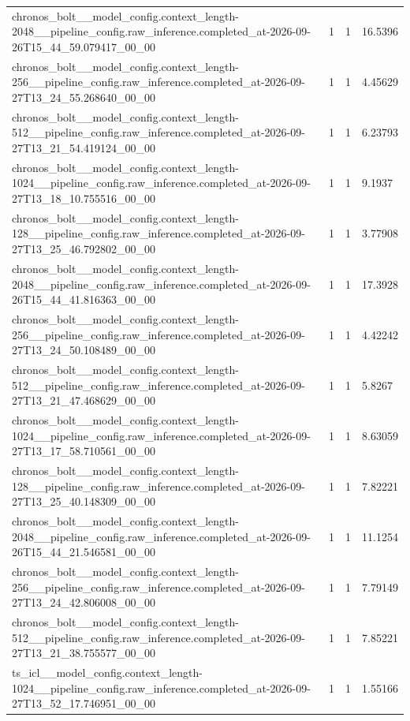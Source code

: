 \begin{tabular}{llll}
chronos\_bolt\_\_model\_config.context\_length-2048\_\_pipeline\_config.raw\_inference.completed\_at-2026-09-26T15\_44\_59.079417\_00\_00 & 1 & 1 & 16.5396 \\
chronos\_bolt\_\_model\_config.context\_length-256\_\_pipeline\_config.raw\_inference.completed\_at-2026-09-27T13\_24\_55.268640\_00\_00 & 1 & 1 & 4.45629 \\
chronos\_bolt\_\_model\_config.context\_length-512\_\_pipeline\_config.raw\_inference.completed\_at-2026-09-27T13\_21\_54.419124\_00\_00 & 1 & 1 & 6.23793 \\
chronos\_bolt\_\_model\_config.context\_length-1024\_\_pipeline\_config.raw\_inference.completed\_at-2026-09-27T13\_18\_10.755516\_00\_00 & 1 & 1 & 9.1937 \\
chronos\_bolt\_\_model\_config.context\_length-128\_\_pipeline\_config.raw\_inference.completed\_at-2026-09-27T13\_25\_46.792802\_00\_00 & 1 & 1 & 3.77908 \\
chronos\_bolt\_\_model\_config.context\_length-2048\_\_pipeline\_config.raw\_inference.completed\_at-2026-09-26T15\_44\_41.816363\_00\_00 & 1 & 1 & 17.3928 \\
chronos\_bolt\_\_model\_config.context\_length-256\_\_pipeline\_config.raw\_inference.completed\_at-2026-09-27T13\_24\_50.108489\_00\_00 & 1 & 1 & 4.42242 \\
chronos\_bolt\_\_model\_config.context\_length-512\_\_pipeline\_config.raw\_inference.completed\_at-2026-09-27T13\_21\_47.468629\_00\_00 & 1 & 1 & 5.8267 \\
chronos\_bolt\_\_model\_config.context\_length-1024\_\_pipeline\_config.raw\_inference.completed\_at-2026-09-27T13\_17\_58.710561\_00\_00 & 1 & 1 & 8.63059 \\
chronos\_bolt\_\_model\_config.context\_length-128\_\_pipeline\_config.raw\_inference.completed\_at-2026-09-27T13\_25\_40.148309\_00\_00 & 1 & 1 & 7.82221 \\
chronos\_bolt\_\_model\_config.context\_length-2048\_\_pipeline\_config.raw\_inference.completed\_at-2026-09-26T15\_44\_21.546581\_00\_00 & 1 & 1 & 11.1254 \\
chronos\_bolt\_\_model\_config.context\_length-256\_\_pipeline\_config.raw\_inference.completed\_at-2026-09-27T13\_24\_42.806008\_00\_00 & 1 & 1 & 7.79149 \\
chronos\_bolt\_\_model\_config.context\_length-512\_\_pipeline\_config.raw\_inference.completed\_at-2026-09-27T13\_21\_38.755577\_00\_00 & 1 & 1 & 7.85221 \\
ts\_icl\_\_model\_config.context\_length-1024\_\_pipeline\_config.raw\_inference.completed\_at-2026-09-27T13\_52\_17.746951\_00\_00 & 1 & 1 & 1.55166 \\

\end{tabular}
